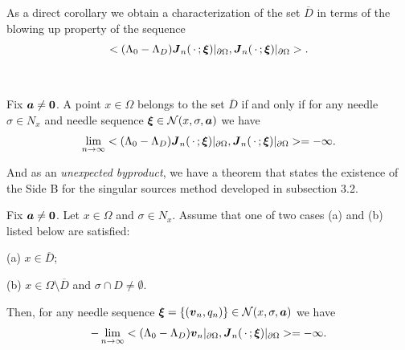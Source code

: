 \endproclaim





As a direct corollary we obtain a characterization of  the set $\overline{D}$ 
in terms of the blowing up property of the sequence
$$\displaystyle
<(\Lambda_0-\Lambda_D)\mbox{\boldmath $J$}_n(\,\cdot\,;\mbox{\boldmath $\xi$})\vert_{\partial\Omega},
\mbox{\boldmath $J$}_n(\,\cdot\,;\mbox{\boldmath $\xi$})\vert_{\partial\Omega}>.
$$


$\quad$




  Fix $\mbox{\boldmath $a$}\not=\mbox{\boldmath $0$}$.
A point $x\in\Omega$ belongs to the set $\overline{D}$ if and only if
for any needle $\sigma\in N_x$ and needle sequence $\mbox{\boldmath $\xi$}\in
{\cal N}(x,\sigma,\mbox{\boldmath $a$})$
we have
$$\displaystyle
\lim_{n\rightarrow\infty}
<(\Lambda_0-\Lambda_D)\mbox{\boldmath $J$}_n(\,\cdot\,;\mbox{\boldmath $\xi$})\vert_{\partial\Omega},
\mbox{\boldmath $J$}_n(\,\cdot\,;\mbox{\boldmath $\xi$})\vert_{\partial\Omega}>
=-\infty.
$$
\endproclaim







And as an {\it unexpected byproduct}, we have a theorem that states the existence of the 
Side B for the singular sources method developed in subsection 3.2.




  Fix $\mbox{\boldmath $a$}\not=\mbox{\boldmath $0$}$.
Let $x\in\Omega$ and $\sigma\in N_x$.  Assume that one of two cases (a) and (b) listed below are satisfied:

\noindent
(a) $x\in\overline{D}$;


\noindent
(b) $x\in\Omega\setminus\overline{D}$ and $\sigma\cap D\not=\emptyset$.


\noindent
Then, for any needle sequence $\mbox{\boldmath $\xi$}=\{(\mbox{\boldmath $v$}_n,q_n)\}\in{\cal N}(x,\sigma,\mbox{\boldmath $a$})$ we have
$$\displaystyle
-\lim_{n\rightarrow\infty}
<(\Lambda_0-\Lambda_D)\mbox{\boldmath $v$}_n\vert_{\partial\Omega},
\mbox{\boldmath $J$}_n(\,\cdot\,;\mbox{\boldmath $\xi$})\vert_{\partial\Omega}>
=-\infty.
$$

\endproclaim

